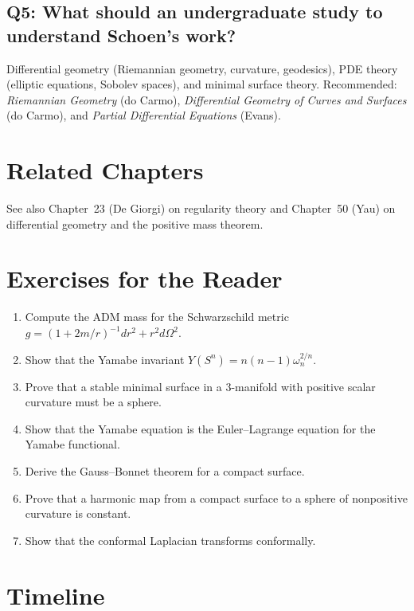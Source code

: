\subsection*{Q5: What should an undergraduate study to understand Schoen's work?}
Differential geometry (Riemannian geometry, curvature, geodesics), PDE theory (elliptic equations, Sobolev spaces), and minimal surface theory. Recommended: \textit{Riemannian Geometry} (do Carmo), \textit{Differential Geometry of Curves and Surfaces} (do Carmo), and \textit{Partial Differential Equations} (Evans).

\section{Related Chapters}
See also Chapter~23 (De Giorgi) on regularity theory and Chapter~50 (Yau) on differential geometry and the positive mass theorem.

\section*{Exercises for the Reader}

\begin{enumerate}
    \item [B] Compute the ADM mass for the Schwarzschild metric $g = (1 + 2m/r)^{-1} dr^2 + r^2 d\Omega^2$.
    \item [I] Show that the Yamabe invariant $Y(S^n) = n(n-1)\omega_n^{2/n}$.
    \item [A] Prove that a stable minimal surface in a 3-manifold with positive scalar curvature must be a sphere.
    \item [B] Show that the Yamabe equation is the Euler--Lagrange equation for the Yamabe functional.
    \item [B] Derive the Gauss--Bonnet theorem for a compact surface.
    \item [I] Prove that a harmonic map from a compact surface to a sphere of nonpositive curvature is constant.
    \item [B] Show that the conformal Laplacian transforms conformally.
\end{enumerate}

\section*{Timeline}

